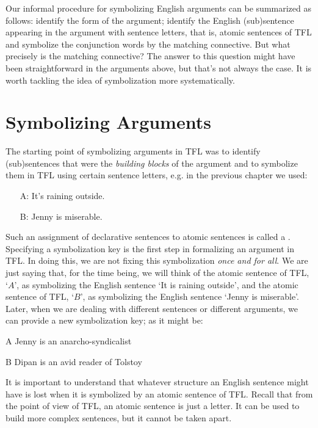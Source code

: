 Our informal procedure for symbolizing English arguments can be summarized as follows: identify the form of the argument; identify the English (sub)sentence appearing in the argument with sentence letters, that is, atomic sentences of TFL and symbolize the conjunction words by the matching connective. But what precisely is the matching connective? The answer to this question might have been straightforward in the arguments above, but that's not always the case. It is worth tackling the idea of symbolization more systematically. %

\chapter{Symbolizing Arguments}
The starting point of symbolizing arguments in TFL was to identify (sub)sentences that were the \emph{building blocks} of the argument and to symbolize them in TFL using certain sentence letters, e.g. in the previous chapter we used:
\begin{itemize}
\item[A:]It's raining outside.
\item[B:]Jenny is miserable.
\end{itemize}
Such an assignment of declarative sentences to atomic sentences is called a . Specifying a symbolization key is the first step in formalizing an argument in TFL. In doing this, we are not fixing this symbolization \emph{once and for all}. We are just saying that, for the time being, we will think of the atomic sentence of TFL, `$A$', as symbolizing the English sentence `It is raining outside', and the atomic sentence of TFL, `$B$', as symbolizing the English sentence `Jenny is miserable'. Later, when we are dealing with different sentences or different arguments, we can provide a new symbolization key; as it might be:
	\begin{ekey}
		\item[A] Jenny is an anarcho-syndicalist
		\item[B] Dipan is an avid reader of Tolstoy
	\end{ekey}
It is important to understand that whatever structure an English sentence might have is lost when it is symbolized by an atomic sentence of TFL. Recall that from the point of view of TFL, an atomic sentence is just a letter. It can be used to build more complex sentences, but it cannot be taken apart.

